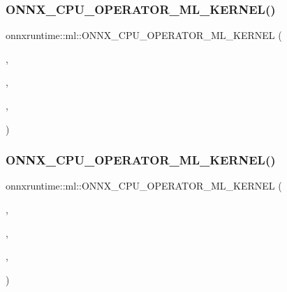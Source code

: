 \subsubsection{\texorpdfstring{O\+N\+N\+X\+\_\+\+C\+P\+U\+\_\+\+O\+P\+E\+R\+A\+T\+O\+R\+\_\+\+M\+L\+\_\+\+K\+E\+R\+N\+E\+L()}{ONNX\_CPU\_OPERATOR\_ML\_KERNEL()}\hspace{0.1cm}{\footnotesize\ttfamily [1/11]}}
{\footnotesize\ttfamily onnxruntime\+::ml\+::\+O\+N\+N\+X\+\_\+\+C\+P\+U\+\_\+\+O\+P\+E\+R\+A\+T\+O\+R\+\_\+\+M\+L\+\_\+\+K\+E\+R\+N\+EL (\begin{DoxyParamCaption}\item[{\mbox{\hyperlink{classonnxruntime_1_1ml_1_1LinearRegressor}{Linear\+Regressor}}}]{,  }\item[{1}]{,  }\item[{\mbox{\hyperlink{classonnxruntime_1_1KernelDefBuilder}{Kernel\+Def\+Builder}}().Type\+Constraint(\char`\"{}T\char`\"{}, Data\+Type\+Impl\+::\+Get\+Tensor\+Type$<$ float $>$())}]{,  }\item[{\mbox{\hyperlink{classonnxruntime_1_1ml_1_1LinearRegressor}{Linear\+Regressor}}$<$ float $>$}]{ }\end{DoxyParamCaption})}

\mbox{\label{namespaceonnxruntime_1_1ml_ae2f29cf14d162850dc318c2c7ddeeca0}} 
\subsubsection{\texorpdfstring{O\+N\+N\+X\+\_\+\+C\+P\+U\+\_\+\+O\+P\+E\+R\+A\+T\+O\+R\+\_\+\+M\+L\+\_\+\+K\+E\+R\+N\+E\+L()}{ONNX\_CPU\_OPERATOR\_ML\_KERNEL()}\hspace{0.1cm}{\footnotesize\ttfamily [2/11]}}
{\footnotesize\ttfamily onnxruntime\+::ml\+::\+O\+N\+N\+X\+\_\+\+C\+P\+U\+\_\+\+O\+P\+E\+R\+A\+T\+O\+R\+\_\+\+M\+L\+\_\+\+K\+E\+R\+N\+EL (\begin{DoxyParamCaption}\item[{\mbox{\hyperlink{classonnxruntime_1_1ml_1_1SVMRegressor}{S\+V\+M\+Regressor}}}]{,  }\item[{1}]{,  }\item[{\mbox{\hyperlink{classonnxruntime_1_1KernelDefBuilder}{Kernel\+Def\+Builder}}().Type\+Constraint(\char`\"{}T\char`\"{}, Data\+Type\+Impl\+::\+Get\+Tensor\+Type$<$ float $>$())}]{,  }\item[{\mbox{\hyperlink{classonnxruntime_1_1ml_1_1SVMRegressor}{S\+V\+M\+Regressor}}$<$ float $>$}]{ }\end{DoxyParamCaption})}

